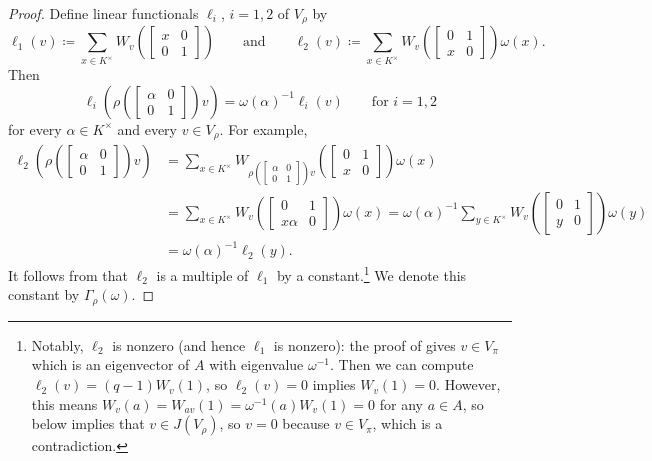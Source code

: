 \documentclass[../main.tex]{subfiles}
\begin{document}
\begin{proof}
	Define linear functionals $\ell_i$, $i=1,2$ of $V_\rho$ by
	\[\ell_1(v)\coloneqq\sum_{x\in K^\times}W_v\left(\begin{bmatrix}
		x & 0 \\
		0 & 1
	\end{bmatrix}\right)\qquad\text{and}\qquad\ell_2(v)\coloneqq\sum_{x\in K^\times}W_v\left(\begin{bmatrix}
		0 & 1 \\
		x & 0
	\end{bmatrix}\right)\omega(x).\]
	Then
	\[\ell_i\left(\rho\left(\begin{bmatrix}
		\alpha & 0 \\
		0 & 1
	\end{bmatrix}\right)v\right)=\omega(\alpha)^{-1}\ell_i(v)\qquad\text{for }i=1,2\]
	for every $\alpha\in K^\times$ and every $v\in V_\rho$. For example,
	\begin{align*}
		\ell_2\left(\rho\left(\begin{bmatrix}
			\alpha & 0 \\
			0 & 1
		\end{bmatrix}\right)v\right) &= \sum_{x\in K^\times}W_{\rho\left(\begin{bmatrix}
			\alpha & 0 \\
			0 & 1
		\end{bmatrix}\right)v}\left(\begin{bmatrix}
			0 & 1 \\
			x & 0
		\end{bmatrix}\right)\omega(x) \\
		&= \sum_{x\in K^\times}W_v\left(\begin{bmatrix}
			0 & 1 \\
			x\alpha & 0
		\end{bmatrix}\right)\omega(x)=\omega(\alpha)^{-1}\sum_{y\in K^\times}W_v\left(\begin{bmatrix}
			0 & 1 \\
			y & 0
		\end{bmatrix}\right)\omega(y) \\
		&= \omega(\alpha)^{-1}\ell_2(y).
	\end{align*}
	It follows from  that $\ell_2$ is a multiple of $\ell_1$ by a constant.\footnote{Notably, $\ell_2$ is nonzero (and hence $\ell_1$ is nonzero): the proof of  gives $v\in V_\pi$ which is an eigenvector of $A$ with eigenvalue $\omega^{-1}$. Then we can compute $\ell_2(v)=(q-1)W_v(1)$, so $\ell_2(v)=0$ implies $W_v(1)=0$. However, this means $W_v(a)=W_{av}(1)=\omega^{-1}(a)W_v(1)=0$ for any $a\in A$, so  below implies that $v\in J(V_\rho)$, so $v=0$ because $v\in V_\pi$, which is a contradiction.} We denote this constant by $\Gamma_\rho(\omega)$.
\end{proof}
\end{document}
